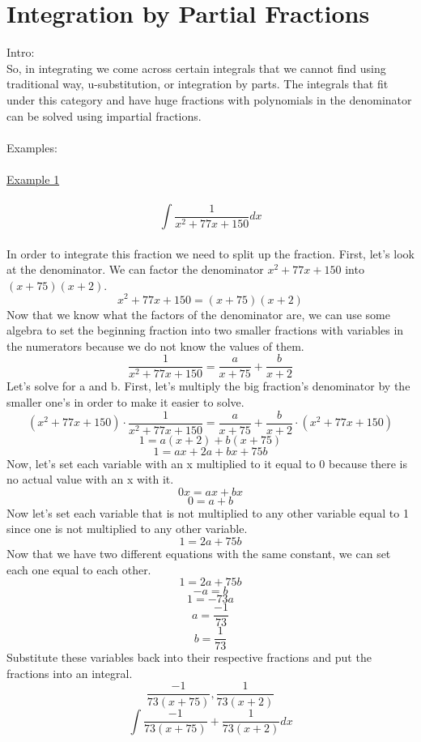 \documentclass[a4paper,openright, 10pt]{article}
\begin{document}
 \section*{Integration by Partial Fractions}
 Intro:
 \\So, in integrating we come across certain integrals that we cannot find using traditional way, u-substitution, or integration by parts. The integrals that fit under this category and have huge fractions with polynomials in the denominator can be solved using impartial fractions.\\
 \\Examples:\\\\
 \underline{Example 1}\\\\
 $$\int\frac{1}{x^2 + 77x +150}dx$$\\
 In order to integrate this fraction we need to split up the fraction. First, let's look at the denominator. We can factor the denominator $x^2+77x+150$ into $(x+75)(x+2)$.\\
 $$x^2+77x+150 = (x+75)(x+2)$$
 Now that we know what the factors of the denominator are, we can use some algebra to set the beginning fraction into two smaller fractions with variables in the numerators because we do not know the values of them.\\
 $$\frac{1}{x^2+77x+150}=\frac{a}{x+75}+\frac{b}{x+2}$$
 Let's solve for a and b. First, let's multiply the big fraction's denominator by the smaller one's in order to make it easier to solve.\\
 $$(x^2+77x+150)\cdot\frac{1}{x^2+77x+150}=\frac{a}{x+75}+\frac{b}{x+2}\cdot(x^2+77x+150)$$
 $$1=a(x+2)+b(x+75)$$
 $$1=ax+2a+bx+75b$$
 Now, let's set each variable with an x multiplied to it equal to 0 because there is no actual value with an x with it.\\
 $$0x=ax+bx$$
 $$0=a+b$$
 Now let's set each variable that is not multiplied to any other variable equal to 1 since one is not multiplied to any other variable.\\
 $$1=2a+75b$$
 Now that we have two different equations with the same constant, we can set each one equal to each other.\\
 $$1=2a+75b$$
  $$-a=b$$
  $$1=-73a$$
  $$a=\frac{-1}{73}$$
  $$b=\frac{1}{73}$$
  Substitute these variables back into their respective fractions and put the fractions into an integral.\\
  $$\frac{-1}{73(x+75)} , \frac{1}{73(x+2)}$$
  $$\int \frac{-1}{73(x+75)}+\frac{1}{73(x+2)}dx$$
\end{document}
